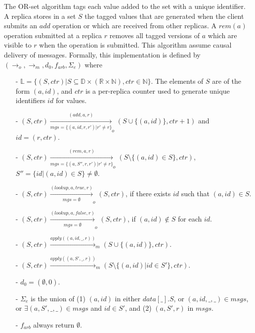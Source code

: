  The OR-set algorithm tags each value added to the set with a unique identifier. A replica stores in a set $S$ the tagged values that are generated when the client submits an $add$ operation or which are received from other replicas. A $\mathit{rem}(a)$ operation submitted at a replica $r$ removes all tagged versions of $a$ which are visible to $r$ when the operation is submitted. This algorithm assume causal delivery of messages. Formally, this implementation is defined by $(\rightarrow_o,\rightarrow_m,d_0,f_{\mathit{arb}}, \Sigma_e)$ where


\begin{itemize}
\setlength{\itemsep}{0.5pt}
\item[-] $\mathbb{L} = \{ (S,\mathit{ctr}) \vert S \subseteq \mathbb{D} \times (\mathbb{R} \times \mathbb{N}), \mathit{ctr} \in \mathbb{N} \}$. The elements of $S$ are of the form $(a,\mathit{id})$, and $\mathit{ctr}$ is a per-replica counter used to generate unique identifiers $\mathit{id}$ for values.

\item[-] $(S,\mathit{ctr}) \xrightarrow[\mathit{mgs} = \{ (a,\mathit{id},r,r') \vert r' \neq r \}]{(\mathit{add},a,r)}_o (S \cup \{ (a,\mathit{id}) \}, \mathit{ctr}+1)$ and $\mathit{id} = (r,\mathit{ctr})$.

\item[-] $(S,\mathit{ctr}) \xrightarrow[\mathit{mgs} = \{ (a,S'',r,r') \vert r' \neq r \} ]{(\mathit{rem},a,r)}_o (S \setminus \{ (a,\mathit{id}) \in S \}, \mathit{ctr})$, $S'' = \{ \mathit{id} \vert (a,\mathit{id}) \in S \} \neq \emptyset$.

\item[-] $(S,\mathit{ctr}) \xrightarrow[\mathit{mgs} = \emptyset]{(\mathit{lookup},a,\mathit{true},r)}_o (S, \mathit{ctr})$, if there exists $\mathit{id}$ such that $(a,\mathit{id}) \in S$.

\item[-] $(S,\mathit{ctr}) \xrightarrow[\mathit{mgs} = \emptyset]{(\mathit{lookup},a,\mathit{false},r)}_o (S, \mathit{ctr})$, if $(a,\mathit{id}) \notin S$ for each $\mathit{id}$.

\item[-] $(S,\mathit{ctr}) \xrightarrow{\mathit{apply}((a,\mathit{id},\_,r))}_m (S \cup \{ (a,\mathit{id}) \}, \mathit{ctr})$.

\item[-] $(S,\mathit{ctr}) \xrightarrow{\mathit{apply}((a,S',\_,r))}_m (S \setminus \{ (a,\mathit{id}) \vert \mathit{id} \in S' \}, \mathit{ctr})$.

\item[-] $d_0 = (\emptyset,0)$.

\item[-] $\Sigma_e$ is the union of (1) $(a,\mathit{id})$ in either $\mathit{data}[\_].S$, or $(a,\mathit{id},\_,\_) \in \mathit{msgs}$, or $\exists (a,S',\_,\_) \in \mathit{msgs}$ and $\mathit{id} \in S'$, and (2) $(a,S',r)$ in $\mathit{msgs}$.

\item[-] $f_{\mathit{arb}}$ always return $\emptyset$.
\end{itemize}





